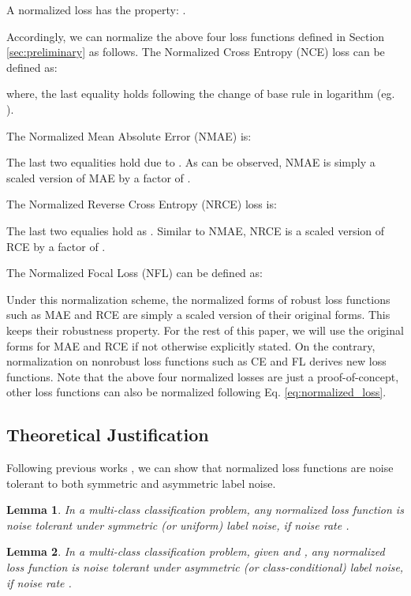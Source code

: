 \documentclass{article}
\newtheorem{lemma}{Lemma}
\begin{document}
A normalized loss has the property: .

Accordingly, we can normalize the above four loss functions defined in Section \ref{sec:preliminary} as follows.
The Normalized Cross Entropy (NCE) loss can be defined as:

where, the last equality holds following the change of base rule in logarithm (eg. ). 

The Normalized Mean Absolute Error (NMAE) is:

The last two equalities hold due to .
As can be observed, NMAE is simply a scaled version of MAE by a factor of .

The Normalized Reverse Cross Entropy (NRCE) loss is:

The last two equalies hold as .
Similar to NMAE, NRCE is a scaled version of RCE by a factor of .

The Normalized Focal Loss (NFL) can be defined as:


Under this normalization scheme, the normalized forms of robust loss functions such as MAE and RCE are simply a scaled version of their original forms. This keeps their robustness property. For the rest of this paper, we will use the original forms for MAE and RCE if not otherwise explicitly stated. On the contrary, normalization on nonrobust loss functions such as CE and FL derives new loss functions.
Note that the above four normalized losses are just a proof-of-concept, other loss functions can also be normalized following Eq. \eqref{eq:normalized_loss}. 

\subsection{Theoretical Justification}
Following previous works \cite{ghosh2017robust,wang2019symmetric}, we can show that normalized loss functions are noise tolerant to both symmetric and asymmetric label noise.

\begin{lemma}\label{lemma_1}
In a multi-class classification problem, any normalized loss function  is noise tolerant under symmetric (or uniform) label noise, if noise rate .
\end{lemma}


\begin{lemma}\label{lemma_2}
In a multi-class classification problem, given  and , any normalized loss function  is noise tolerant under asymmetric (or class-conditional) label noise, if noise rate .
\end{lemma}
\end{document}

